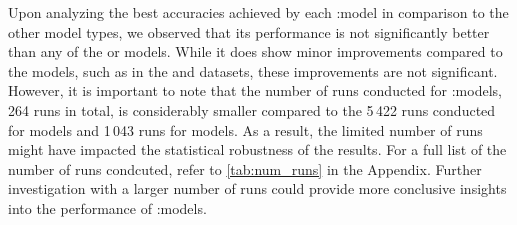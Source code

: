 \begin{table}[!htb]
	\caption{Overview of the classification accuracies achieved by the best model configuration for each dataset in percent and standard deviation. Additionally, the performance of each configuration was furhter evaluated by substituting the final \mlp with either a \textsf{SVM} utilizing a linear kernel (\textsf{SVM Linear}) or the Radial Basis Function (\textsf{SVM RBF}), as well as the \textsf{$k$-NN} classifier with different values for $k$.}
	\label{tab:wlnn_gnn}
\end{table}
Upon analyzing the best accuracies achieved by each \wl:\gnn model in comparison to the other model types, we observed that its performance is not significantly better than any of the \gnn or \wlnn models. While it does show minor improvements compared to the \gnn models, such as in the \enzymes and \proteins datasets, these improvements are not significant. However, it is important to note that the number of runs conducted for \wl:\gnn models, 264 runs in total, is considerably smaller compared to the 5\,422 runs conducted for \wlnn models and 1\,043 runs for \gnn models. As a result, the limited number of runs might have impacted the statistical robustness of the results. For a full list of the number of runs condcuted, refer to \cref{tab:num_runs} in the Appendix. Further investigation with a larger number of runs could provide more conclusive insights into the performance of \wl:\gnn models.

